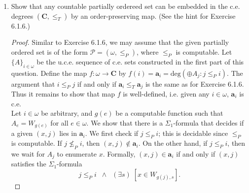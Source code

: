 \documentclass{article}
\begin{document}
\begin{enumerate}[label={(\roman*)}]
\begin{proof}
        Consider the potential witness that we has been considered for
        $R_{\langle e,i\rangle}$ at stages greater than $s'$. Note that we
        will always consider potential witnesses for $R_{\langle
        e,i\rangle}$ because the higher prioity requirements that are not
        acted at stage $s'$ will never be acted after stage $s'$.
        Observe that since the restraints imposed by the higher priority
        requirements never change after stage $s'$, the potential witness
        $x\in w_{e,i}-A_i^{s'}$ that we consider will always be the same
        one. Our argument from here will then be similar to the argument
        for the base case - since $\Phi_e^{\oplus_{j\neq i} A_j}(x)$
        converges by assumption, we wait for the first stage $s\geq s'$
        where the sequences involved in the computation stabalizes. Since
        $x\not\in A_i^{s'}$ and $x$ will never be enumerated into $A_i$
        because $R_{\langle e,i\rangle}$ is never acted after stage
        $s'$, we must have $\Phi_e^{\oplus_{j\neq i} A_j}(x)=A_i(x)=0$, and
        $R_{\langle e,i\rangle}$ must have been chosen to be acted and
        have $x$ enumerated into $A_i$ at stage $s$, a contradiction.
      \end{proof}

    \item Show that any countable partially ordereed set can be embedded in
      the c.e. degrees $(\bm{C},\leq_T)$ by an order-preserving map.
      (See the hint for Exercise 6.1.6.)

      \begin{proof}
        Similar to Exercise 6.1.6, we may assume that the given partially
        ordered set is of the form $\mathcal{P}=(\omega,\leq_P)$, where
        $\leq_P$ is computable. Let $\{A\}_{i\in\omega}$ be the u.c.e.
        sequence of c.e. sets constructed in the first part of this
        question. Define the map $f:\omega\rightarrow \bm{C}$ by
        $f(i)=\bm{a}_i=\text{deg}(\oplus A_j:j\leq_P i)$. The argument that
        $i\leq_P j$ if and only if $\bm{a}_i\leq_T\bm{a}_j$ is the same as
        for Exercise 6.1.6. Thus it remains to show that map $f$ is
        well-defined, i.e. given any $i\in\omega$, $\bm{a}_i$ is c.e. \\

        Let $i\in\omega$ be arbitrary, and $g(e)$ be a computable function
        such that $A_e=W_{g(e)}$ for all $e\in\omega$. We show that there
        is a $\Sigma_1$-formula that decides if a given $(x,j)$ lies in
        $\bm{a}_i$. We first check if $j\leq_P i$; this is decidable since
        $\leq_P$ is computable. If $j\not\leq_P i$, then
        $(x,j)\not\in\bm{a}_i$. On the other hand, if $j\leq_P i$, then we
        wait for $A_j$ to enumerate $x$. Formally, $(x,j)\in\bm{a}_i$ if
        and only if $(x,j)$ satisfies the $\Sigma_1$-formula
        \[j\leq_Pi\;\; \wedge\;\; (\exists s)\; [x\in W_{g(j),s}].\]
      \end{proof}
  \end{enumerate}
\end{document}
